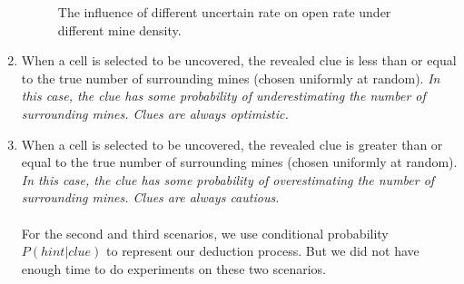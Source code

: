 \documentclass[letter]{article}
\begin{document}
\begin{enumerate}
\begin{figure}[H]
		\caption{\label{fig:plt2} The influence of different uncertain rate on open rate under different mine density.}
		\endminipage
	\end{figure}

	\item {When a cell is selected to be uncovered, the revealed clue is less than or equal to the true number of surrounding mines (chosen uniformly at random). \textit{In this case, the clue has some probability of underestimating the number of surrounding mines. Clues are always optimistic.}}
	\item {When a cell is selected to be uncovered, the revealed clue is greater than or equal to the true number of surrounding mines (chosen uniformly at random). \textit{In this case, the clue has some probability of overestimating the number of surrounding mines. Clues are always cautious.}}\\
	\\
	For the second and third scenarios, we use conditional probability $ P(hint|clue) $ to represent our deduction process. But we did not have enough time to do experiments on these two scenarios.
\end{enumerate}
\end{document}
